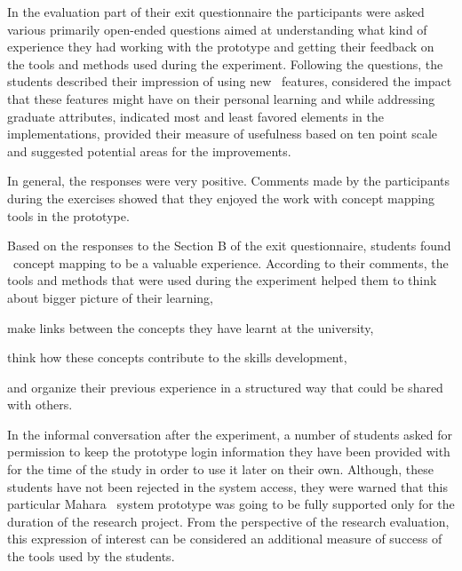In the evaluation part of their exit questionnaire the participants were asked
various primarily open-ended questions aimed at understanding what kind of
experience they had working with the prototype and getting their feedback on the
tools and methods used during the experiment. Following the questions, the
students described their impression of using new \ep~features, considered the
impact that these features might have on their personal learning and while
addressing graduate attributes, indicated most and least favored elements in the
implementations, provided their measure of usefulness based on ten point scale
and suggested potential areas for the improvements.

In general, the responses were very positive. Comments made by the participants
during the exercises showed that they enjoyed the work with concept mapping
tools in the prototype. 

Based on the responses to the Section B of the exit questionnaire, students
found \ep~concept mapping to be a valuable experience. According to their
comments, the tools and methods that were used during the experiment helped
them to think about bigger picture of their learning, 


make links between the concepts they have learnt at the university, 

think how these concepts contribute to the skills development, 

and organize their previous experience in a structured way that could be shared
with others.

In the informal conversation after the experiment, a number of students asked
for permission to keep the prototype login information they have been provided
with for the time of the study in order to use it later on their own. Although,
these students have not been rejected in the system access, they were warned
that this particular Mahara \ep~system prototype was going to be fully supported
only for the duration of the research project. From the perspective of the
research evaluation, this expression of interest can be considered an additional
measure of success of the tools used by the students.

